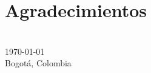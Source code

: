 \chapter*{Agradecimientos}





{
\makeatletter
\vspace{1cm}
\raggedleft
\@author{}\\
\today{}\\
Bogotá, Colombia\\
\raggedright
\makeatother
}
